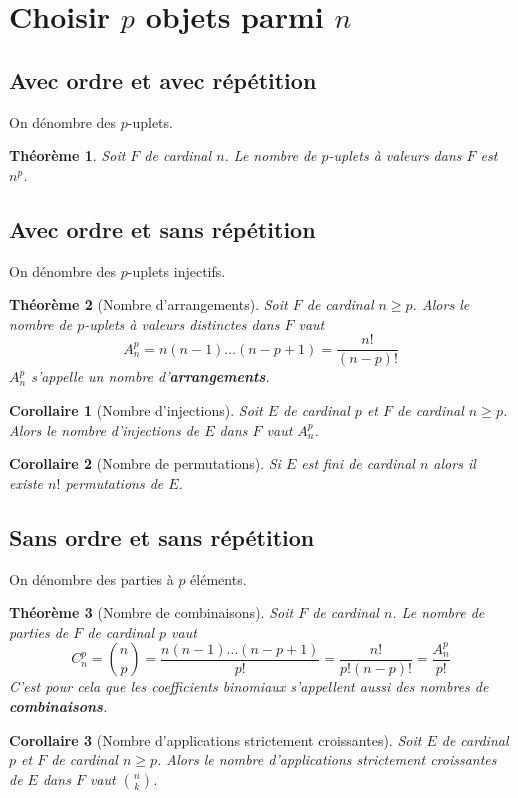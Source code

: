 \documentclass[french]{book}
\theoremstyle{plain}
\newtheorem{thm}{Théorème}[chapter]
\newtheorem{cor}{Corollaire}[chapter]
\theoremstyle{definition}
\theoremstyle{remark}
\begin{document}
\section{Choisir $p$ objets parmi $n$}
\subsection{Avec ordre et avec répétition}
On dénombre des $p$-uplets.
\begin{thm}
	Soit $F$ de cardinal $n$. Le nombre de $p$-uplets à valeurs dans $F$ est $n^p$.
\end{thm}
\subsection{Avec ordre et sans répétition}
On dénombre des $p$-uplets injectifs.
\begin{thm}[Nombre d'arrangements]
	Soit $F$ de cardinal $n\geqslant p$. Alors le nombre de $p$-uplets à valeurs distinctes dans $F$ vaut $$A_n^p=n(n-1)\ldots(n-p+1)=\frac{n!}{(n-p)!}$$ $A_n^p$ s'appelle un nombre d'\textbf{arrangements}.
\end{thm}
\begin{cor}[Nombre d'injections]
	Soit $E$ de cardinal $p$ et $F$ de cardinal $n\geqslant p$. Alors le nombre d'injections de $E$ dans $F$ vaut $A_n^p$.
\end{cor}
\begin{cor}[Nombre de permutations]
	Si $E$ est fini de cardinal $n$ alors il existe $n!$ permutations de $E$.
\end{cor}
\subsection{Sans ordre et sans répétition}
On dénombre des parties à $p$ éléments.
\begin{thm}[Nombre de combinaisons]
	Soit $F$ de cardinal $n$. Le nombre de parties de $F$ de cardinal $p$ vaut $$C_n^p=\binom{n}{p}=\frac{n(n-1)\ldots(n-p+1)}{p!}=\frac{n!}{p!(n-p)!}=\frac{A_n^p}{p!}$$ C'est pour cela que les coefficients binomiaux s'appellent aussi des nombres de \textbf{combinaisons}.
\end{thm}
\begin{cor}[Nombre d'applications strictement croissantes]
	Soit $E$ de cardinal $p$ et $F$ de cardinal $n\geqslant p$. Alors le nombre d'applications strictement croissantes de $E$ dans $F$ vaut $\binom{n}{k}$.
\end{cor}
\end{document}
